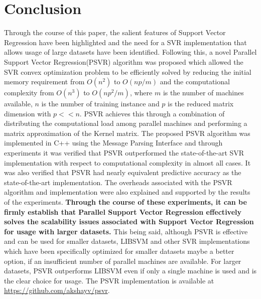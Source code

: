 \documentclass[12pt]{article}
\begin{document}
\section{Conclusion}
Through the course of this paper, the salient features of Support Vector Regression have been highlighted and the need for a SVR implementation that allows usage of large datasets have been identified. Following this, a novel Parallel Support Vector Regression(PSVR) algorithm was proposed which  allowed the SVR convex optimization problem to be efficiently solved by reducing the initial memory requirement from $O(n^2)$ to $O(np/m)$ and the computational complexity from $O(n^3)$ to $O(np^2/m)$,  where $m$ is the number of machines available, $n$ is the number of training instance and $p$ is the reduced matrix dimension with $p << n$. PSVR  achieves this through a combination of distributing the computational load among parallel machines and performing a matrix approximation of the Kernel matrix.
\newline\newline
The proposed PSVR algorithm was implemented in C++ using the Message Parsing Interface and through experiments it was verified that PSVR outperformed the state-of-the-art SVR implementation with respect to computational complexity in almost all cases. It was also verified that PSVR had nearly equivalent predictive accuracy as the state-of-the-art implementation. The overheads associated with the PSVR algorithm and implementation were also explained and supported by the results of the experiments. 
\newline
\newline
{\bf Through the course of these experiments, it can be firmly establish that Parallel Support Vector Regression effectively solves the scalability issues associated with Support Vector Regression for usage with larger datasets.}
\newline
\newline
This being said, although PSVR is effective and can be used for smaller datasets, LIBSVM and other SVR implementations which have been specifically optimized for smaller datasets maybe a better option, if an insufficient number of parallel machines are available. For larger datasets, PSVR outperforms LIBSVM even if only a single machine is used and is the clear choice for usage.
\newline\newline
The PSVR implementation is available at \url{https://github.com/akshayv/psvr}. 
\end{document}
